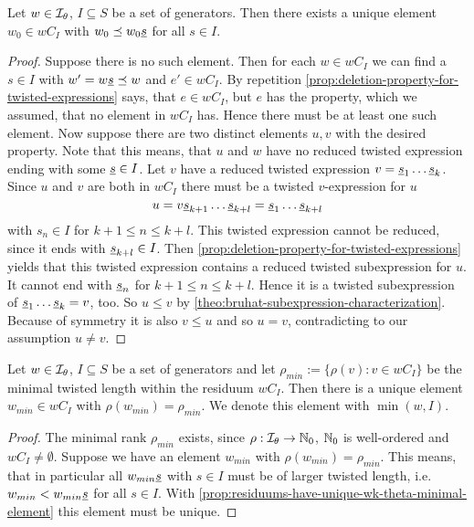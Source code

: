 \begin{prop}
	Let $w \in \mathcal{I}_{\theta}$, $I \subseteq S$ be a set of generators. Then there exists a unique element $w_0 \in wC_I$ with $w_0 \preceq w_0 \underline{s}$ for all $s \in I$.

	\begin{proof}
		Suppose there is no such element. Then for each $w \in wC_I$ we can find a $s \in I$ with $w' = w \underline{s} \preceq w$ and $e' \in wC_I$. By repetition \ref{prop:deletion-property-for-twisted-expressions} says, that $e \in wC_I$, but $e$ has the property, which we assumed, that no element in $wC_I$ has. Hence there must be at least one such element. Now suppose there are two distinct elements $u,v$ with the desired property. Note that this means, that $u$ and $w$ have no reduced twisted expression ending with some $\underline{s} \in I$. Let $v$ have a reduced twisted expression $v = \underline{s}_1 \ldots \underline{s}_k$. Since $u$ and $v$ are both in $wC_I$ there must be a twisted $v$-expression for $u$
		$$ u = v \underline{s}_{k+1} \ldots \underline{s}_{k+l} = \underline{s}_1 \ldots \underline{s}_{k+l} $$
		with $s_n \in I$ for $k+1 \leq n \leq k+l$. This twisted expression cannot be reduced, since it ends with $\underline{s}_{k+l} \in I$. Then \ref{prop:deletion-property-for-twisted-expressions} yields that this twisted expression contains a reduced twisted subexpression for $u$. It cannot end with $\underline{s}_n$ for $k+1 \leq n \leq k+l$. Hence it is a twisted subexpression of $\underline{s}_1 \ldots \underline{s}_k = v$, too. So $u \leq v$ by \ref{theo:bruhat-subexpression-characterization}. Because of symmetry it is also $v \leq u$ and so $u = v$, contradicting to our assumption $u \neq v$.
	\end{proof}
\end{prop}

\begin{coro}
	Let $w \in \mathcal{I}_{\theta}$, $I \subseteq S$ be a set of generators and let $\rho_{min} := \{ \rho(v) : v \in wC_I \}$ be the minimal twisted length within the residuum $wC_I$. Then there is a unique element $w_{min} \in wC_I$ with $\rho(w_{min}) = \rho_{min}$. We denote this element with $\min(w,I)$.

	\begin{proof}
		The minimal rank $\rho_{min}$ exists, since $\rho : \mathcal{I}_{\theta} \to \mathbb{N}_0$, $\mathbb{N}_0$ is well-ordered and $wC_I \neq \emptyset$. Suppose we have an element $w_{min}$ with $\rho(w_{min}) = \rho_{min}$. This means, that in particular all $w_{min} \underline{s}$ with $s \in I$ must be of larger twisted length, i.e. $w_{min} < w_{min} \underline{s}$ for all $s \in I$. With \ref{prop:residuums-have-unique-wk-theta-minimal-element} this element must be unique.
	\end{proof}
\end{coro}

